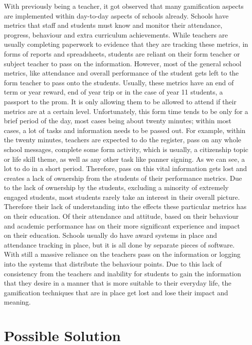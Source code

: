 \documentclass{sigchi}
\begin{document}
With previously being a teacher, it got observed that many gamification aspects are implemented within day-to-day aspects of schools already. Schools have metrics that staff and students must know and monitor their attendance, progress, behaviour and extra curriculum achievements. While teachers are usually completing paperwork to evidence that they are tracking these metrics, in forms of reports and spreadsheets, students are reliant on their form teacher or subject teacher to pass on the information. However, most of the general school metrics, like attendance and overall performance of the student gets left to the form teacher to pass onto the students. Usually, these metrics have an end of term or year reward, end of year trip or in the case of year 11 students, a passport to the prom. It is only allowing them to be allowed to attend if their metrics are at a certain level. Unfortunately, this form time tends to be only for a brief period of the day, most cases being about twenty minutes; within most cases, a lot of tasks and information needs to be passed out. For example, within the twenty minutes, teachers are expected to do the register, pass on any whole school messages, complete some form activity, which is usually, a citizenship topic or life skill theme, as well as any other task like panner signing. As we can see, a lot to do in a short period. Therefore, pass on this vital information gets lost and creates a lack of ownership from the students of their performance metrics. Due to the lack of ownership by the students, excluding a minority of extremely engaged students, most students rarely take an interest in their overall picture. Therefore their lack of understanding into the effects these particular metrics has on their education. Of their attendance and attitude, based on their behaviour and academic performance has on their more significant experience and impact on their education. Schools usually do have award systems in place and attendance tracking in place, but it is all done by separate pieces of software. With still a massive reliance on the teachers pass on the information or logging into the systems that distribute the behaviour points. Due to this lack of consistency from the teachers and inability for students to gain the information that they desire in a manner that is more suitable to their everyday life, the gamification techniques that are in place get lost and lose their impact and meaning. 

\section{Possible Solution}
\end{document}
